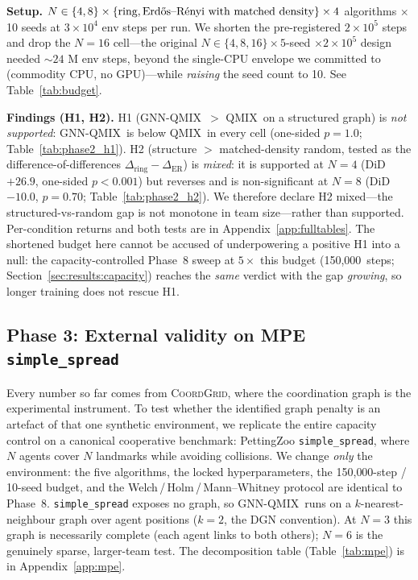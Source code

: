 \documentclass[manuscript, screen, review]{jair}
\newcommand{\algoname}[1]{\textsc{#1}}
\newcommand{\qmix}{\algoname{QMIX}}
\newcommand{\gnnqmix}{\algoname{GNN-QMIX}}
\newcommand{\coordgrid}{\textsc{CoordGrid}}
\newcommand{\PEsteps}{150{,}000}      %
\newcommand{\PEseeds}{10}             %
\begin{document}
\textbf{Setup.} $N \in \{4, 8\} \times \{\text{ring}, \text{Erd\H{o}s--R\'enyi
with matched density}\} \times 4$ algorithms $\times$ 10 seeds at
$3\times 10^4$ env steps per run. We shorten the pre-registered
$2 \times 10^5$ steps and drop the $N{=}16$ cell---the original
$N \in \{4, 8, 16\} \times 5$-seed $\times 2 \times 10^5$ design needed
${\sim}24$ M env steps, beyond the single-CPU envelope we committed to
(commodity CPU, no GPU)---while \emph{raising} the seed count to 10.
See Table~\ref{tab:budget}.

\textbf{Findings (H1, H2).} H1 (\gnnqmix\ $>$ \qmix\ on a structured graph)
is \emph{not supported}: \gnnqmix\ is below \qmix\ in every cell (one-sided
$p=1.0$; Table~\ref{tab:phase2_h1}). H2 (structure $>$ matched-density random,
tested as the difference-of-differences $\Delta_{\text{ring}}-\Delta_{\text{ER}}$)
is \emph{mixed}: it is supported at $N{=}4$ (DiD $+26.9$, one-sided $p<0.001$)
but reverses and is non-significant at $N{=}8$ (DiD $-10.0$, $p=0.70$;
Table~\ref{tab:phase2_h2}). We therefore declare H2 mixed---the
structured-vs-random gap is not monotone in team size---rather than supported.
Per-condition returns and both tests are in Appendix~\ref{app:fulltables}.
The shortened budget here cannot be accused of underpowering a positive H1
into a null: the capacity-controlled Phase~8 sweep at $5\times$ this budget
(\PEsteps\ steps; Section~\ref{sec:results:capacity}) reaches the \emph{same}
verdict with the gap \emph{growing}, so longer training does not rescue H1.



\subsection{Phase 3: External validity on MPE \texttt{simple\_spread}}
\label{sec:results:mpe}

Every number so far comes from \coordgrid, where the coordination graph is
the experimental instrument. To test whether the identified graph penalty
is an artefact of that one synthetic environment, we replicate the entire
capacity control on a canonical cooperative benchmark: PettingZoo
\texttt{simple\_spread}, where $N$ agents cover $N$ landmarks while
avoiding collisions. We change \emph{only} the environment: the five
algorithms, the locked hyperparameters, the \PEsteps-step / \PEseeds-seed
budget, and the Welch\,/\,Holm\,/\,Mann--Whitney protocol are identical to
Phase~8. \texttt{simple\_spread} exposes no graph, so \gnnqmix\ runs on a
$k$-nearest-neighbour graph over agent positions ($k{=}2$, the DGN
convention). At $N{=}3$ this graph is necessarily complete (each agent
links to both others); $N{=}6$ is the genuinely sparse, larger-team test.
The decomposition table (Table~\ref{tab:mpe}) is in Appendix~\ref{app:mpe}.
\end{document}
